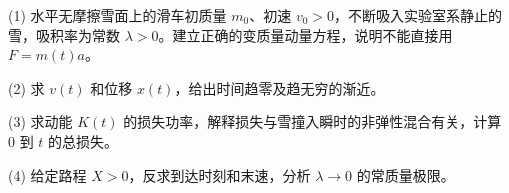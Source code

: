 (1) 水平无摩擦雪面上的滑车初质量 \(m_0\)、初速 \(v_0>0\)，不断吸入实验室系静止的雪，吸积率为常数 \(\lambda>0\)。建立正确的变质量动量方程，说明不能直接用 \(F=m(t)a\)。

(2) 求 \(v(t)\) 和位移 \(x(t)\)，给出时间趋零及趋无穷的渐近。

(3) 求动能 \(K(t)\) 的损失功率，解释损失与雪撞入瞬时的非弹性混合有关，计算 \(0\) 到 \(t\) 的总损失。

(4) 给定路程 \(X>0\)，反求到达时刻和末速，分析 \(\lambda\to0\) 的常质量极限。
